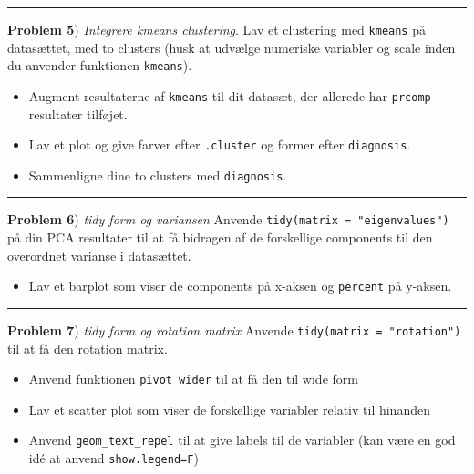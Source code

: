 \documentclass[
]{book}
\providecommand{\tightlist}{%
  \setlength{\itemsep}{0pt}\setlength{\parskip}{0pt}}
\begin{document}
\begin{center}\rule{0.5\linewidth}{0.5pt}\end{center}

\textbf{Problem 5}) \emph{Integrere kmeans clustering}. Lav et clustering med \texttt{kmeans} på datasættet, med to clusters (husk at udvælge numeriske variabler og scale inden du anvender funktionen \texttt{kmeans}).

\begin{itemize}
\tightlist
\item
  Augment resultaterne af \texttt{kmeans} til dit datasæt, der allerede har \texttt{prcomp} resultater tilføjet.
\item
  Lav et plot og give farver efter \texttt{.cluster} og former efter \texttt{diagnosis}.
\item
  Sammenligne dine to clusters med \texttt{diagnosis}.
\end{itemize}

\begin{center}\rule{0.5\linewidth}{0.5pt}\end{center}

\textbf{Problem 6}) \emph{tidy form og variansen} Anvende \texttt{tidy(matrix\ =\ "eigenvalues")} på din PCA resultater til at få bidragen af de forskellige components til den overordnet varianse i datasættet.

\begin{itemize}
\tightlist
\item
  Lav et barplot som viser de components på x-aksen og \texttt{percent} på y-aksen.
\end{itemize}

\begin{center}\rule{0.5\linewidth}{0.5pt}\end{center}

\textbf{Problem 7}) \emph{tidy form og rotation matrix} Anvende \texttt{tidy(matrix\ =\ "rotation")} til at få den rotation matrix.

\begin{itemize}
\tightlist
\item
  Anvend funktionen \texttt{pivot\_wider} til at få den til wide form
\item
  Lav et scatter plot som viser de forskellige variabler relativ til hinanden
\item
  Anvend \texttt{geom\_text\_repel} til at give labels til de variabler (kan være en god idé at anvend \texttt{show.legend=F})
\end{itemize}
\end{document}
